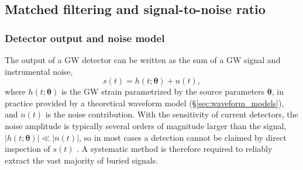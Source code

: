 \subsection{Matched filtering and signal-to-noise ratio}
\label{sec:matched_filtering}

\subsubsection{Detector output and noise model}

The output of a GW detector can be written as the sum of a 
GW signal and instrumental noise,
\begin{equation}
    s(t) = h(t;\boldsymbol{\theta}) + n(t),
    \label{eq:detector_output}
\end{equation}
where $h(t;\boldsymbol{\theta})$ is the GW strain parametrized by the source parameters $\boldsymbol{\theta}$, in practice provided by a theoretical waveform model (\S\ref{sec:waveform_models}), and $n(t)$ is the noise contribution. With the sensitivity of current detectors, the noise amplitude is typically several orders of magnitude larger than the signal, $|h(t;\boldsymbol{\theta})| \ll |n(t)|$, so in most cases a detection cannot be claimed by direct inspection of $s(t)$ \cite{maggiore2007gravitational}. A systematic method is therefore required to reliably extract the vast majority of buried signals.

